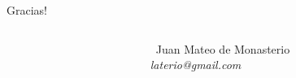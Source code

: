 \documentclass{beamer}
\begin{document}

%
%
%
%
%
%
%



\begin{frame}{Gracias! }
	\begin{columns}
		\begin{column}{0.20 \textwidth}
		\end{column}
		\begin{column}{0.55 \textwidth}
				\center\
				Juan Mateo de Monasterio \\
				\textit{laterio@gmail.com} \\
		\end{column}
	\end{columns}
\end{frame}


\justifying%





\vfill
\end{document}
